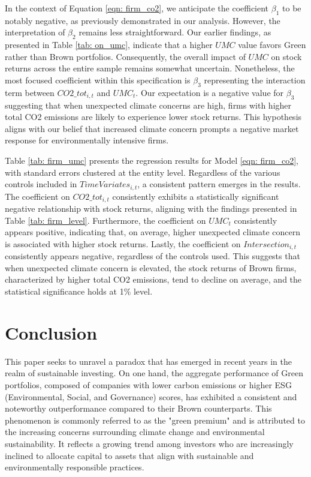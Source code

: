 \documentclass[12pt]{article}
\begin{document}
In the context of Equation \ref{eqn: firm_co2}, we anticipate the coefficient $\beta_1$ to be notably negative, as previously demonstrated in our analysis. However, the interpretation of $\beta_2$ remains less straightforward. Our earlier findings, as presented in Table \ref{tab: on_umc}, indicate that a higher $UMC$ value favors Green rather than Brown portfolios. Consequently, the overall impact of $UMC$ on stock returns across the entire sample remains somewhat uncertain. Nonetheless, the most focused coefficient within this specification is $\beta_3$ representing the interaction term between $CO2\_tot_{i,t}$ and $UMC_t$. Our expectation is a negative value for $\beta_3$ suggesting that when unexpected climate concerns are high, firms with higher total CO2 emissions are likely to experience lower stock returns. This hypothesis aligns with our belief that increased climate concern prompts a negative market response for environmentally intensive firms.

Table \ref{tab: firm_umc} presents the regression results for Model \ref{eqn: firm_co2}, with standard errors clustered at the entity level. Regardless of the various controls included in $TimeVariates_{i,t}$, a consistent pattern emerges in the results. The coefficient on $CO2\_tot_{i,t}$ consistently exhibits a statistically significant negative relationship with stock returns, aligning with the findings presented in Table \ref{tab: firm_level}. Furthermore, the coefficient on $UMC_t$ consistently appears positive, indicating that, on average, higher unexpected climate concern is associated with higher stock returns. Lastly, the coefficient on $Intersection_{i,t}$ consistently appears negative, regardless of the controls used. This suggests that when unexpected climate concern is elevated, the stock returns of Brown firms, characterized by higher total CO2 emissions, tend to decline on average, and the statistical significance holds at 1\% level.

\clearpage
\section{Conclusion} \label{sec:conclusion}

This paper seeks to unravel a paradox that has emerged in recent years in the realm of sustainable investing. On one hand, the aggregate performance of Green portfolios, composed of companies with lower carbon emissions or higher ESG (Environmental, Social, and Governance) scores, has exhibited a consistent and noteworthy outperformance compared to their Brown counterparts. This phenomenon is commonly referred to as the "green premium" and is attributed to the increasing concerns surrounding climate change and environmental sustainability. It reflects a growing trend among investors who are increasingly inclined to allocate capital to assets that align with sustainable and environmentally responsible practices.
\end{document}
